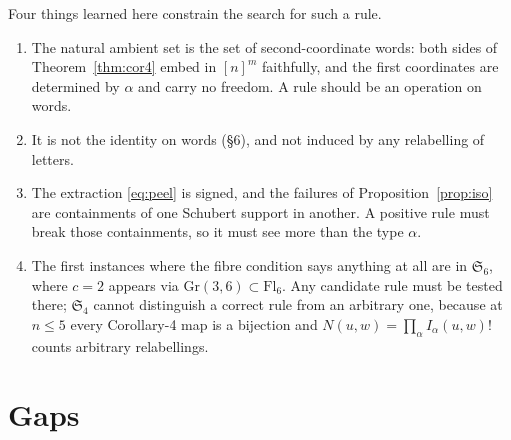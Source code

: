 \documentclass[11pt]{article}
\theoremstyle{plain}
\theoremstyle{definition}
\begin{document}
Four things learned here constrain the search for such a rule.
\begin{enumerate}
\item The natural ambient set is the set of second-coordinate words: both sides
  of Theorem~\ref{thm:cor4} embed in $[n]^m$ faithfully, and the first
  coordinates are determined by $\alpha$ and carry no freedom.  A rule should be
  an operation on words.
\item It is not the identity on words (\S6), and not induced by any relabelling
  of letters.
\item The extraction \eqref{eq:peel} is signed, and the failures of
  Proposition~\ref{prop:iso} are containments of one Schubert support in another.
  A positive rule must break those containments, so it must see more than the
  type $\alpha$.
\item The first instances where the fibre condition says anything at all are in
  $\mathfrak{S}_6$, where $c=2$ appears via $\mathrm{Gr}(3,6)\subset
  \mathrm{Fl}_6$.  Any candidate rule must be tested there; $\mathfrak{S}_4$
  cannot distinguish a correct rule from an arbitrary one, because at $n\le5$
  every Corollary-4 map is a bijection and $N(u,w)=\prod_\alpha I_\alpha(u,w)!$
  counts arbitrary relabellings.
\end{enumerate}

\section*{Gaps}
\end{document}
